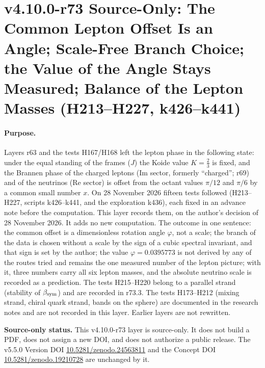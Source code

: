 
\clearpage
\section*{v4.10.0-r73 Source-Only: The Common Lepton Offset Is an Angle; Scale-Free Branch Choice; the Value of the Angle Stays Measured; Balance of the Lepton Masses (H213--H227, k426--k441)}
\label{sec:v4100-r73-lepton-angle-balance}

\paragraph{Purpose.}
Layers r63 and the tests H167/H168 left the lepton phase in the following state: under the equal standing of the frames (\(J\)) the Koide
value \(K=\tfrac23\) is fixed, and the Brannen phase of the charged leptons (Im sector, formerly ``charged''; r69) and of the neutrinos
(Re sector) is offset from the octant values \(\pi/12\) and \(\pi/6\) by a common small number \(x\).  On 28 November 2026 fifteen tests
followed (H213--H227, scripts k426--k441, and the exploration k436), each fixed in an advance note before the computation.  This layer
records them, on the author's decision of 28 November 2026.  It adds no new computation.  The outcome in one sentence: the common offset
is a dimensionless rotation angle \(\varphi\), not a scale; the branch of the data is chosen without a scale by the sign of a cubic spectral
invariant, and that sign is set by the author; the value \(\varphi=0.0395773\) is not derived by any of the routes tried and remains the one
measured number of the lepton picture; with it, three numbers carry all six lepton masses, and the absolute neutrino scale is recorded as a
prediction.  The tests H215--H220 belong to a parallel strand (stability of \(\beta_{\rm sym}\)) and are recorded in r73.3.  The tests
H173--H212 (mixing strand, chiral quark strand, bands on the sphere) are documented in the research notes and are not recorded in this
layer.  Earlier layers are not rewritten.

\noindent\textbf{Source-only status.}
This v4.10.0-r73 layer is source-only.  It does not build a PDF, does not assign a new DOI,
and does not authorize a public release.  The v5.5.0 Version DOI
\href{https://doi.org/10.5281/zenodo.24563811}{10.5281/zenodo.24563811} and the Concept DOI
\href{https://doi.org/10.5281/zenodo.19210728}{10.5281/zenodo.19210728} are unchanged by it.

